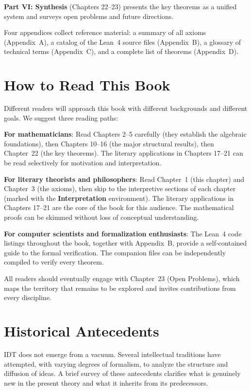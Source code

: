 \documentclass[11pt,openany]{book}
\theoremstyle{definition}
\theoremstyle{plain}
\theoremstyle{remark}
\begin{document}
\textbf{Part VI: Synthesis} (Chapters 22--23) presents the key theorems as a unified system and surveys open problems and future directions.

Four appendices collect reference material: a summary of all axioms (Appendix~A), a catalog of the Lean~4 source files (Appendix~B), a glossary of technical terms (Appendix~C), and a complete list of theorems (Appendix~D).

\section{How to Read This Book}

Different readers will approach this book with different backgrounds and different goals. We suggest three reading paths:

\textbf{For mathematicians}: Read Chapters 2--5 carefully (they establish the algebraic foundations), then Chapters 10--16 (the major structural results), then Chapter~22 (the key theorems). The literary applications in Chapters 17--21 can be read selectively for motivation and interpretation.

\textbf{For literary theorists and philosophers}: Read Chapter~1 (this chapter) and Chapter~3 (the axioms), then skip to the interpretive sections of each chapter (marked with the \textbf{Interpretation} environment). The literary applications in Chapters 17--21 are the core of the book for this audience. The mathematical proofs can be skimmed without loss of conceptual understanding.

\textbf{For computer scientists and formalization enthusiasts}: The Lean~4 code listings throughout the book, together with Appendix~B, provide a self-contained guide to the formal verification. The companion files can be independently compiled to verify every theorem.

All readers should eventually engage with Chapter~23 (Open Problems), which maps the territory that remains to be explored and invites contributions from every discipline.

\section{Historical Antecedents}

IDT does not emerge from a vacuum. Several intellectual traditions have attempted, with varying degrees of formalism, to analyze the structure and diffusion of ideas. A brief survey of these antecedents clarifies what is genuinely new in the present theory and what it inherits from its predecessors.
\end{document}
